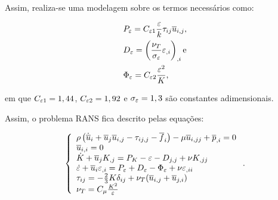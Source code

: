 Assim, realiza-se uma modelagem sobre os termos necessários como:

\begin{subequations}
    \begin{align}
         & P_\varepsilon=C_{\varepsilon 1}\frac{\varepsilon}{k}\tau_{ij}\overline{u}_{i,j}\text{,}   \\
         & D_\varepsilon=\left({\frac{\nu_T}{\sigma_\varepsilon}\varepsilon_{,i}}\right)_{,i}\text{e} \\
         & \Phi_\varepsilon=C_{\varepsilon 2}\frac{\varepsilon^2}{K}\text{,}
    \end{align}
\end{subequations}

\noindent em que $C_{\varepsilon 1}=1,44$, $C_{\varepsilon 2}=1,92$ e $\sigma_\varepsilon=1,3$ são constantes adimensionais.

Assim, o problema RANS fica descrito pelas equações:

\begin{equation}
    \left\{
    \begin{array}{l}
        \rho\left({\dot{\overline{u}}_i+\overline{u}_j\overline{u}_{i,j}-\tau_{ij,j}-\overline{f}_i}\right)-\mu\overline{u}_{i,jj}+\overline{p}_{,i}=0    \\
        \overline{u}_{i,i}=0                                                                                               \\
        \dot{K}+\overline{u}_jK_{,j}=P_K-\varepsilon-D_{j,j}+\nu K_{,jj}                                                   \\
        \dot{\varepsilon}+\overline{u}_i\varepsilon_{,i}=P_\varepsilon+D_\varepsilon-\Phi_\varepsilon+\nu\varepsilon_{,ii} \\
        \tau_{ij}=-\frac{2}{3}K\delta_{ij}+\nu_T(\overline{u}_{i,j}+\overline{u}_{j,i})                                         \\
        \nu_T=C_\mu\frac{K^2}{\varepsilon}
    \end{array}
    \right.\text{.}
\end{equation}